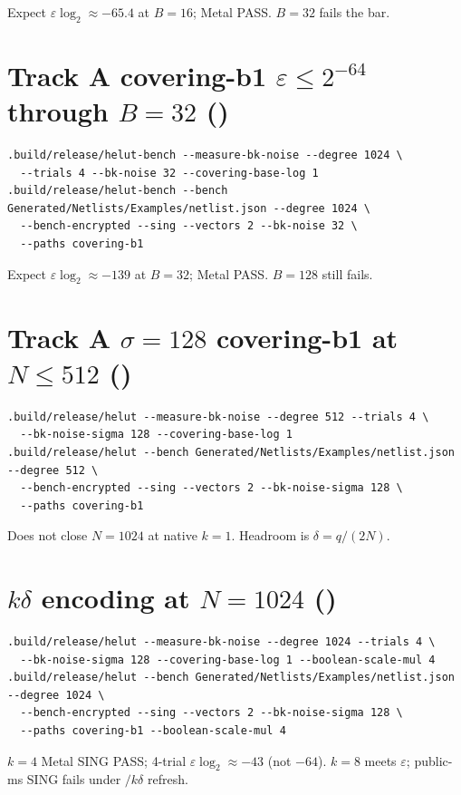 Expect $\varepsilon\log_2\approx-65.4$ at $B{=}16$; Metal PASS. $B{=}32$ fails the bar.

\section{Track A covering-b1 $\varepsilon\le 2^{-64}$ through $B{=}32$ ()}

\begin{lstlisting}
.build/release/helut-bench --measure-bk-noise --degree 1024 \
  --trials 4 --bk-noise 32 --covering-base-log 1
.build/release/helut-bench --bench Generated/Netlists/Examples/netlist.json --degree 1024 \
  --bench-encrypted --sing --vectors 2 --bk-noise 32 \
  --paths covering-b1
\end{lstlisting}

Expect $\varepsilon\log_2\approx-139$ at $B{=}32$; Metal PASS. $B{=}128$ still fails.

\section{Track A $\sigma{=}128$ covering-b1 at $N\le 512$ ()}

\begin{lstlisting}
.build/release/helut --measure-bk-noise --degree 512 --trials 4 \
  --bk-noise-sigma 128 --covering-base-log 1
.build/release/helut --bench Generated/Netlists/Examples/netlist.json --degree 512 \
  --bench-encrypted --sing --vectors 2 --bk-noise-sigma 128 \
  --paths covering-b1
\end{lstlisting}

Does not close $N{=}1024$ at native $k{=}1$. Headroom is $\delta=q/(2N)$.

\section{$k\delta$ encoding at $N{=}1024$ (\cid{43})}

\begin{lstlisting}
.build/release/helut --measure-bk-noise --degree 1024 --trials 4 \
  --bk-noise-sigma 128 --covering-base-log 1 --boolean-scale-mul 4
.build/release/helut --bench Generated/Netlists/Examples/netlist.json --degree 1024 \
  --bench-encrypted --sing --vectors 2 --bk-noise-sigma 128 \
  --paths covering-b1 --boolean-scale-mul 4
\end{lstlisting}

$k{=}4$ Metal SING PASS; 4-trial $\varepsilon\log_2\approx-43$ (not $-64$).
$k{=}8$ meets $\varepsilon$; public-ms SING fails under $/k\delta$ refresh.

